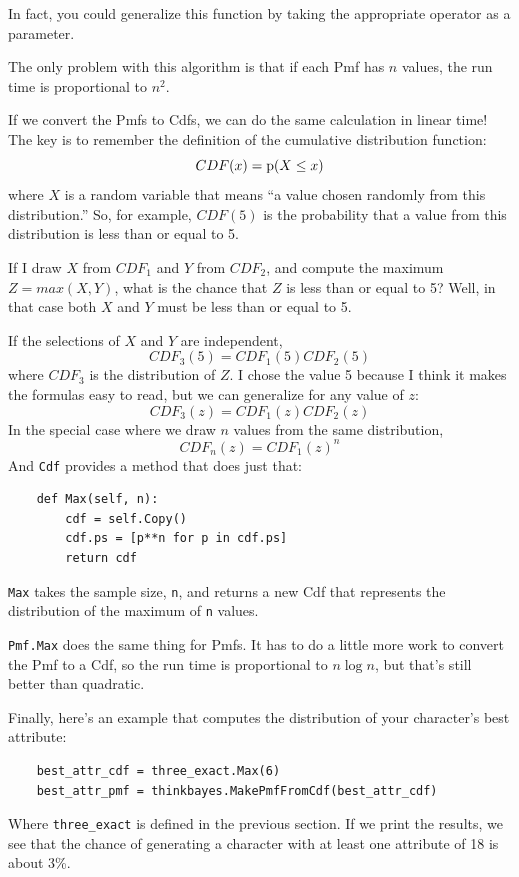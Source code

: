 \documentclass[12pt]{book}
\begin{document}
In fact, you could generalize this function by taking the
appropriate operator as a parameter.

The only problem with this algorithm is that if each Pmf
has $n$ values, the run time is proportional to $n^2$.

If we convert the Pmfs to Cdfs, we can do the same calculation
in linear time!  The key is to remember the definition of the
cumulative distribution function:
%
\[ CDF(x) = \mathrm{p}(X \le x) \]
%
where $X$ is a random variable that means ``a value chosen
randomly from this distribution.''  So, for example, $CDF(5)$
is the probability that a value from this distribution is less
than or equal to 5.

If I draw $X$ from $CDF_1$ and $Y$ from $CDF_2$, and compute
the maximum $Z = max(X, Y)$, what is the chance that $Z$ is
less than or equal to 5?  Well, in that case both $X$ and $Y$
must be less than or equal to 5.

If the selections of $X$ and $Y$ are independent,
%
\[ CDF_3(5) = CDF_1(5) CDF_2(5) \] 
%
where $CDF_3$ is the distribution of $Z$.  I chose the value
5 because I think it makes the formulas easy to read, but we
can generalize for any value of $z$:
%
\[ CDF_3(z) = CDF_1(z) CDF_2(z) \]
%
In the special case where we draw $n$ values from the same
distribution, 
%
\[ CDF_n(z) = CDF_1(z)^n \]
%
And \verb"Cdf" provides a method that does just that:

\begin{verbatim}
    def Max(self, n):
        cdf = self.Copy()
        cdf.ps = [p**n for p in cdf.ps]
        return cdf
\end{verbatim}

\verb"Max" takes the sample size, {\tt n}, and returns a new
Cdf that represents the distribution of the maximum of {\tt n}
values.

\verb"Pmf.Max" does the same thing for Pmfs.  It has to
do a little more work to convert the Pmf to a Cdf, so the
run time is proportional to $n \log n$, but that's still
better than quadratic.

Finally, here's an example that computes the distribution of
your character's best attribute:

\begin{verbatim}
    best_attr_cdf = three_exact.Max(6)
    best_attr_pmf = thinkbayes.MakePmfFromCdf(best_attr_cdf)
\end{verbatim}

Where \verb"three_exact" is defined in the previous section.
If we print the results, we see that the chance of generating
a character with at least one attribute of 18 is about 3\%.
\end{document}
